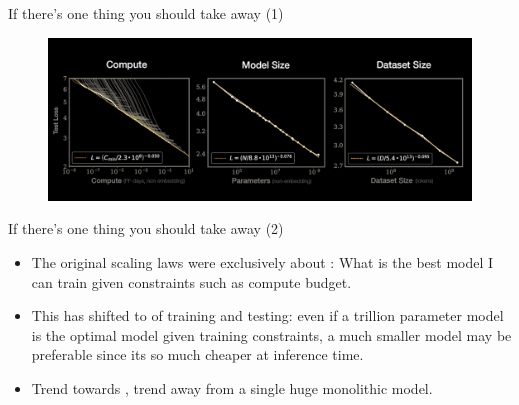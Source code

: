\begin{vbframe}{If there's one thing you should take away (1)}

\vfill

\begin{figure}
	\centering
	\includegraphics[width = 12cm]{./figure/3thingserrorratescaleswith.png} \\ 
\end{figure}

\vfill

\end{vbframe}

\begin{vbframe}{If there's one thing you should take away (2)}


\vfill

\begin{itemize}
	\item The original scaling laws were exclusively
        about : What is the best model
        I can train given
        constraints such as compute budget.

\item This has shifted to  of training
        and testing: even if a trillion parameter model is the optimal
        model given training constraints, a much smaller
        model may be preferable since its so much cheaper at
        inference time.

\item Trend towards , trend away
        from a single huge monolithic model.

\end{itemize}

\vfill

\end{vbframe}



\endlecture

